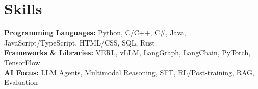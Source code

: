 \section{Skills}
 \begin{itemize}[leftmargin=0.15in, label={}]
    \small{\item{
        \textbf{Programming Languages:} Python, C/C++, C\#, Java, JavaScript/TypeScript, HTML/CSS, SQL, Rust \\
        \textbf{Frameworks \& Libraries:} VERL, vLLM, LangGraph, LangChain, PyTorch, TensorFlow\\
        \textbf{AI Focus:} LLM Agents, Multimodal Reasoning, SFT, RL/Post-training, RAG, Evaluation
    }}
 \end{itemize}
